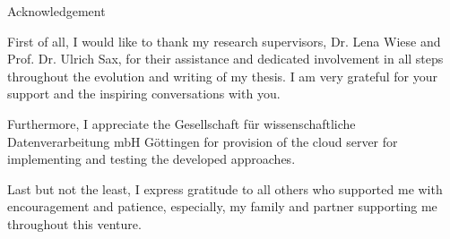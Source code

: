 
\thispagestyle{empty}
\null
\textnormal{\LARGE Acknowledgement}\par
\vspace{1cm}

First of all, I would like to thank my research supervisors, Dr. Lena Wiese and Prof. Dr. Ulrich Sax, for their assistance and dedicated involvement in all steps 
throughout the evolution and writing of my thesis. I am very grateful for your support and the inspiring conversations with you.

Furthermore, I appreciate the Gesellschaft für wissenschaftliche Datenverarbeitung mbH Göttingen for provision of the cloud server for implementing and testing the
developed approaches. 

Last but not the least, I express gratitude to all others who supported me with encouragement and patience, especially, my family and partner supporting me 
throughout this venture.